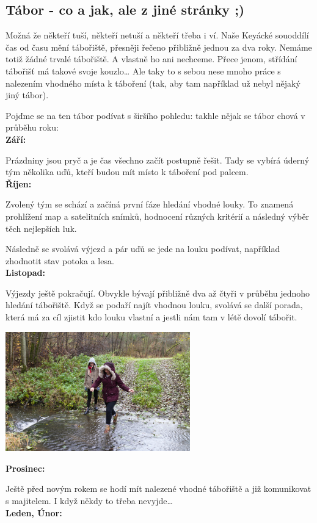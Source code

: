 \subsection*{Tábor - co a jak, ale z jiné stránky ;)} %
\label{ssub:tábor_co_a_jak}


Možná že někteří tuší, někteří netuší a někteří třeba i ví. Naše Keyácké souoddílí čas od času mění tábořiště, přesněji řečeno přibližně jednou za dva roky. Nemáme totiž žádné trvalé tábořiště. A vlastně ho ani nechceme.
Přece jenom, střídání tábořišť má takové svoje kouzlo… 
Ale taky to s sebou nese mnoho práce s nalezením vhodného místa k táboření (tak, aby tam například už nebyl nějaký jiný tábor).

Pojďme se na ten tábor podívat s širšího pohledu: takhle nějak se tábor chová v průběhu roku: \\
\textbf{Září:}

Prázdniny jsou pryč a je čas všechno začít postupně řešit. Tady se vybírá úderný tým několika uďů, kteří budou mít místo k táboření pod palcem.\\
\textbf{Říjen:}

Zvolený tým se schází a začíná první fáze hledání vhodné louky. To znamená prohlížení map a satelitních snímků, hodnocení různých kritérií a následný výběr těch nejlepších luk.

Následně se svolává výjezd a pár uďů se jede na louku podívat, například zhodnotit stav potoka a lesa.\\
\textbf{Listopad:}

Výjezdy ještě pokračují. Obvykle bývají přibližně dva až čtyři v průběhu jednoho hledání tábořiště.
Když se podaří najít vhodnou louku, svolává se další porada, která má za cíl zjistit kdo louku vlastní a jestli nám tam v létě dovolí tábořit.
\begin{center}
\includegraphics[width=8cm]{img/udo_clanky/hledani_brod.jpg}
\end{center}
\textbf{Prosinec:}

Ještě před novým rokem se hodí mít nalezené vhodné tábořiště a již komunikovat s majitelem. I když někdy to třeba nevyjde…\\
\textbf{Leden, Únor:}

